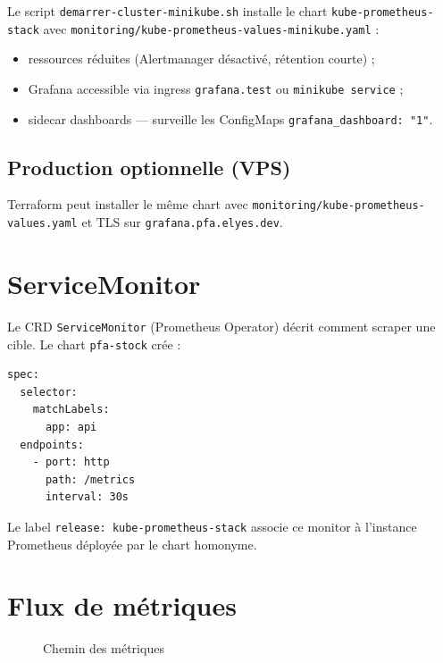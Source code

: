 Le script \texttt{demarrer-cluster-minikube.sh} installe le chart \texttt{kube-prometheus-stack} avec \texttt{monitoring/kube-prometheus-values-minikube.yaml} :
\begin{itemize}
  \item ressources réduites (Alertmanager désactivé, rétention courte) ;
  \item Grafana accessible via ingress \texttt{grafana.test} ou \texttt{minikube service} ;
  \item sidecar dashboards — surveille les ConfigMaps \texttt{grafana\_dashboard: "1"}.
\end{itemize}

\subsection{Production optionnelle (VPS)}

Terraform peut installer le même chart avec \texttt{monitoring/kube-prometheus-values.yaml} et TLS sur \texttt{grafana.pfa.elyes.dev}.

\section{ServiceMonitor}

Le CRD \texttt{ServiceMonitor} (Prometheus Operator) décrit comment scraper une cible. Le chart \texttt{pfa-stock} crée :

\begin{lstlisting}[style=yaml,caption={Extrait ServiceMonitor (conceptuel)}]
spec:
  selector:
    matchLabels:
      app: api
  endpoints:
    - port: http
      path: /metrics
      interval: 30s
\end{lstlisting}

Le label \texttt{release: kube-prometheus-stack} associe ce monitor à l'instance Prometheus déployée par le chart homonyme.

\section{Flux de métriques}

\begin{figure}[htbp]
  \centering
  \caption{Chemin des métriques}
  \label{fig:metrics-flow}
\end{figure}

